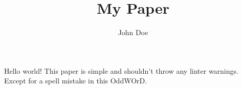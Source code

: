 \documentclass{article}
\author{John Doe}
\begin{document}
\title{My Paper}
\maketitle

Hello world! This paper is simple and shouldn't throw any linter warnings. Except for a spell mistake in this OddWOrD.
\end{document}
